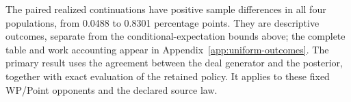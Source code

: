 \begin{table}[htbp]
\centering\small

\caption{Expected controller-minus-parent match-win improvement, in percentage
points (pp), under independent uniform valid deals. Bounds are simultaneous
at least 95\% across the four populations and the derived equal mixtures.
Every source remains in the denominator. Lower bounds are rounded down;
exact fractions determine the criterion. Mixtures reuse the population
samples and add no source matches.}
\label{tab:uniform-primary}
\end{table}

The paired realized continuations have positive sample differences in all four
populations, from 0.0488 to 0.8301 percentage points. They are descriptive
outcomes, separate from the conditional-expectation bounds above; the complete
table and work accounting appear in Appendix~\ref{app:uniform-outcomes}.
The primary result uses the agreement between the deal generator and the
posterior, together with exact evaluation of the retained policy. It applies
to these fixed WP/Point opponents and the declared source law.
